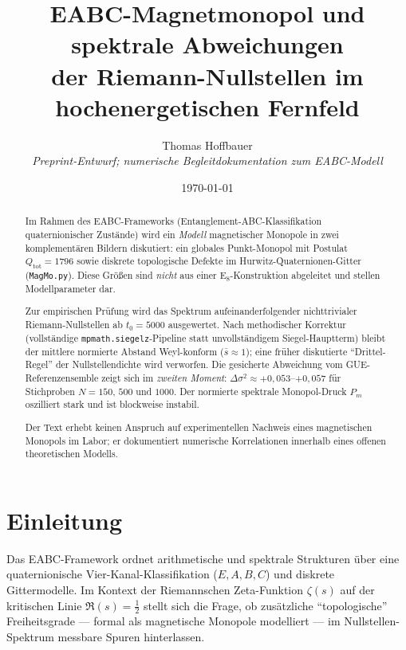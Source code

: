 \documentclass[11pt,a4paper]{article}
\title{EABC-Magnetmonopol und spektrale Abweichungen\\
  der Riemann-Nullstellen im hochenergetischen Fernfeld}
\author{Thomas Hoffbauer\\[0.5em]
  \small\textit{Preprint-Entwurf; numerische Begleitdokumentation zum EABC-Modell}}
\date{\today}
\begin{document}
\maketitle

\begin{abstract}
  Im Rahmen des EABC-Frameworks (Entanglement-ABC-Klassifikation quaternionischer
  Zustände) wird ein \emph{Modell} magnetischer Monopole in zwei komplementären
  Bildern diskutiert: ein globales Punkt-Monopol mit Postulat
  $Q_{\mathrm{tot}}=1796$ sowie diskrete topologische Defekte im Hurwitz-Quaternionen-Gitter
  (\texttt{MagMo.py}). Diese Größen sind \emph{nicht} aus einer E$_8$-Konstruktion
  abgeleitet und stellen Modellparameter dar.

  Zur empirischen Prüfung wird das Spektrum aufeinanderfolgender nichttrivialer
  Riemann-Nullstellen ab $t_0=5000$ ausgewertet. Nach methodischer Korrektur
  (vollständige \texttt{mpmath.siegelz}-Pipeline statt unvollständigem Siegel-Hauptterm)
  bleibt der mittlere normierte Abstand Weyl-konform ($\bar{s}\approx 1$); eine
  früher diskutierte ``Drittel-Regel'' der Nullstellendichte wird verworfen.
  Die gesicherte Abweichung vom GUE-Referenzensemble zeigt sich im \emph{zweiten Moment}:
  $\Delta\sigma^2 \approx +0{,}053$--$+0{,}057$ für Stichproben $N=150$, $500$ und $1000$.
  Der normierte spektrale Monopol-Druck $P_m$ oszilliert stark und ist blockweise instabil.

  Der Text erhebt keinen Anspruch auf experimentellen Nachweis eines magnetischen
  Monopols im Labor; er dokumentiert numerische Korrelationen innerhalb eines
  offenen theoretischen Modells.
\end{abstract}

\section{Einleitung}
\label{sec:einleitung}

Das EABC-Framework ordnet arithmetische und spektrale Strukturen über eine
quaternionische Vier-Kanal-Klassifikation ($E,A,B,C$) und diskrete Gittermodelle.
Im Kontext der Riemannschen Zeta-Funktion $\zeta(s)$ auf der kritischen Linie
$\Re(s)=\tfrac12$ stellt sich die Frage, ob zusätzliche ``topologische'' Freiheitsgrade
--- formal als magnetische Monopole modelliert --- im Nullstellen-Spektrum messbare
Spuren hinterlassen.
\end{document}
